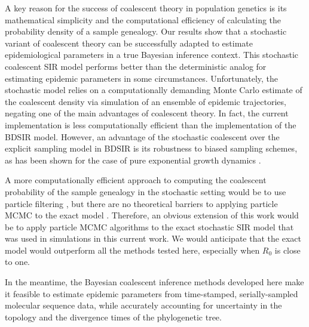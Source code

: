 \documentclass[12pt,titlepage]{article}
\newcommand{\BDSIR}{BDSIR}
\begin{document}
A key reason for the success of coalescent theory in population genetics is its mathematical simplicity and
the computational efficiency of calculating the probability density of a sample genealogy.
Our results show that a stochastic variant of coalescent theory can be successfully adapted to estimate epidemiological parameters in a true Bayesian inference context.
This stochastic coalescent SIR model performs better than the deterministic analog for estimating epidemic parameters in some circumstances.
Unfortunately, the stochastic model relies on a computationally demanding Monte Carlo estimate of the coalescent density via simulation of an ensemble of epidemic trajectories, negating one of the main advantages of coalescent theory.
In fact, the current implementation is less computationally efficient than the implementation of the BDSIR model. 
However, an advantage of the stochastic coalescent over the explicit sampling model in \BDSIR{} is its robustness to biased sampling schemes, as has been shown for the case of pure exponential growth dynamics \citep{Veronika}.

A more computationally efficient approach to computing the coalescent probability of the sample genealogy in the stochastic setting would be to use particle filtering \citep{Andrieu:2009,andrieu2010particle,Rasmussen2011,Rasmussen2014}, but there are no theoretical barriers to applying particle MCMC to the exact model \citep{Stadler:2014}.
Therefore, an obvious extension of this work would be to apply particle MCMC algorithms to the exact stochastic SIR model that was used in simulations in this current work. We would anticipate that the exact model would outperform all the methods tested here, especially when $R_0$ is close to one.

In the meantime, the Bayesian coalescent inference methods developed here make it feasible to estimate epidemic parameters from time-stamped, serially-sampled molecular sequence data, while accurately accounting for uncertainty in the topology and the divergence times of the phylogenetic tree.
\end{document}
